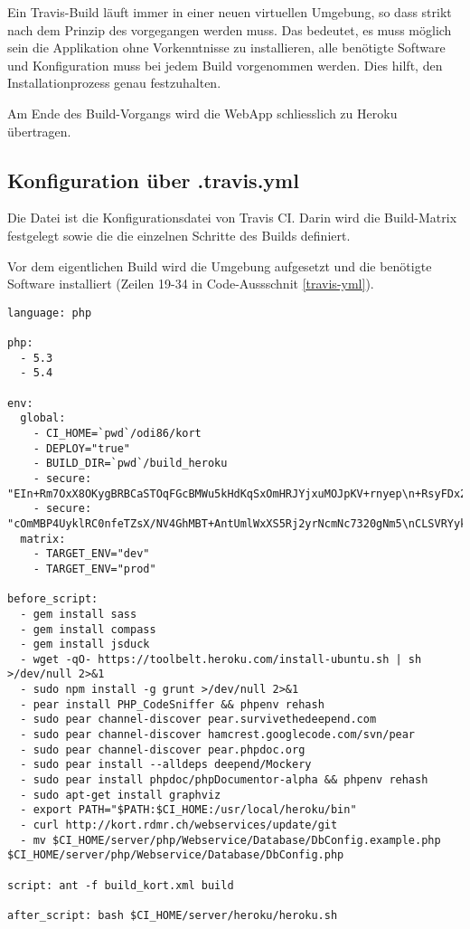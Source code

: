 Ein Travis-Build läuft immer in einer neuen virtuellen Umgebung, so dass strikt nach dem Prinzip des \emph{} vorgegangen werden muss.
Das bedeutet, es muss möglich sein die Applikation ohne Vorkenntnisse zu installieren, alle benötigte Software und Konfiguration muss bei jedem Build vorgenommen werden.
Dies hilft, den Installationprozess genau festzuhalten.

Am Ende des Build-Vorgangs wird die \gls{WebApp} schliesslich zu Heroku übertragen.

\subsection{Konfiguration über .travis.yml}
Die  Datei ist die Konfigurationsdatei von Travis CI.
Darin wird die Build-Matrix festgelegt sowie die die einzelnen Schritte des Builds definiert.

Vor dem eigentlichen Build wird die Umgebung aufgesetzt und die benötigte Software installiert (Zeilen 19-34 in Code-Aussschnit \ref{travis-yml}).

\lstset{language=XML}
\begin{lstlisting}[float, caption=Die Travis CI Konfigurationsdatei .travis.yml, label=travis-yml]
language: php

php:
  - 5.3
  - 5.4

env:
  global:
    - CI_HOME=`pwd`/odi86/kort
    - DEPLOY="true"
    - BUILD_DIR=`pwd`/build_heroku
    - secure: "EIn+Rm7OxX8OKygBRBCaSTOqFGcBMWu5kHdKqSxOmHRJYjxuMOJpKV+rnyep\n+RsyFDx2Z9yKlqRRS4cpZh7M6wwC63EV46+7aWtzzTjnbMZfVzLQA9EmaEU4\nYMsKGtpQk2mhvaNKd3UbEpDl0Zq74NnAY0zipx0l02UymcFnZEc="
    - secure: "cOmMBP4UyklRC0nfeTZsX/NV4GhMBT+AntUmlWxXS5Rj2yrNcmNc7320gNm5\nCLSVRYyk7/8feyUEMznWrUn/62htZp0tEBAWtXg86dgIZgH4HPy9l2pKuSsH\nxZTHgjUJI7JOuyLG4ID9D5maVLE35UWag/NEtcRVy5QXLZOrs0M="
  matrix:
    - TARGET_ENV="dev"
    - TARGET_ENV="prod"

before_script:
  - gem install sass
  - gem install compass
  - gem install jsduck
  - wget -qO- https://toolbelt.heroku.com/install-ubuntu.sh | sh >/dev/null 2>&1
  - sudo npm install -g grunt >/dev/null 2>&1
  - pear install PHP_CodeSniffer && phpenv rehash
  - sudo pear channel-discover pear.survivethedeepend.com
  - sudo pear channel-discover hamcrest.googlecode.com/svn/pear
  - sudo pear channel-discover pear.phpdoc.org
  - sudo pear install --alldeps deepend/Mockery
  - sudo pear install phpdoc/phpDocumentor-alpha && phpenv rehash
  - sudo apt-get install graphviz
  - export PATH="$PATH:$CI_HOME:/usr/local/heroku/bin"
  - curl http://kort.rdmr.ch/webservices/update/git
  - mv $CI_HOME/server/php/Webservice/Database/DbConfig.example.php $CI_HOME/server/php/Webservice/Database/DbConfig.php

script: ant -f build_kort.xml build

after_script: bash $CI_HOME/server/heroku/heroku.sh
\end{lstlisting}

